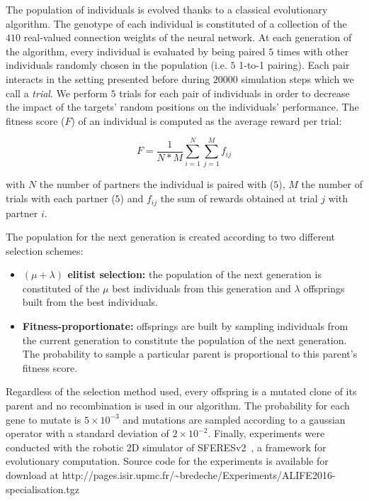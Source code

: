     The population of individuals is evolved thanks to a classical evolutionary algorithm. The genotype of each individual is constituted of a collection of the $410$ real-valued connection weights of the neural network. At each generation of the algorithm, every individual is evaluated by being paired $5$ times with other individuals randomly chosen in the population (i.e. $5$ 1-to-1 pairing). Each pair interacts in the setting presented before during $20000$ simulation steps which we call a \emph{trial}. We perform $5$ trials for each pair of individuals in order to decrease the impact of the targets' random positions on the individuals' performance. The fitness score (\(F\)) of an individual is computed as the average reward per trial:

    \[
    F = \frac{1}{N*M} \sum_{i=1}^{N} \sum_{j=1}^{M} f_{ij}
    \]

    with \(N\) the number of partners the individual is paired with ($5$), \(M\) the number of trials with each partner ($5$) and \(f_{ij}\) the sum of rewards obtained at trial \(j\) with partner \(i\).

    The population for the next generation is created according to two different selection schemes:

    \begin{itemize}
      \item{\textbf{\((\mu + \lambda)\) elitist selection:} the population of the next generation is constituted of the $\mu$ best individuals from this generation and $\lambda$ offsprings built from the best individuals.}
      \item{\textbf{Fitness-proportionate:} offsprings are built by sampling individuals from the current generation to constitute the population of the next generation. The probability to sample a particular parent is proportional to this parent's fitness score.}
    \end{itemize}

    Regardless of the selection method used, every offspring is a mutated clone of its parent and no recombination is used in our algorithm. The probability for each gene to mutate is \(5 \times 10^{-3}\) and mutations are sampled according to a gaussian operator with a standard deviation of \(2 \times 10^{-2}\). Finally, experiments were conducted with the robotic 2D simulator of SFERESv2~\cite{Mouret2010}, a framework for evolutionary computation. Source code for the experiments is available for download at http://pages.isir.upmc.fr/\textasciitilde bredeche/Experiments/ALIFE2016-specialisation.tgz
    

